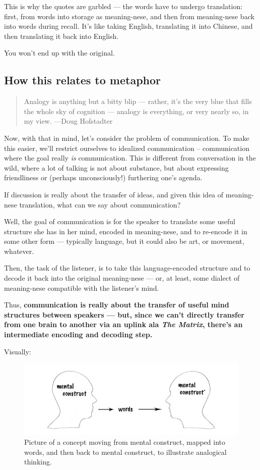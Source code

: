 This is why the quotes are garbled --- the
words have to undergo translation: first, from words into storage as meaning-nese, and then from meaning-nese back into words during recall.
It's like taking English, translating it into Chinese, and then
translating it back into English.

You won't end up with the original.

\subsection{How this relates to
metaphor}\label{how-this-relates-to-metaphor}

\begin{quote}
Analogy is anything but a bitty blip --- rather, it's the very blue that
fills the whole sky of cognition --- analogy is everything, or very
nearly so, in my view. \label{quote-attribute}{---Doug Hofstadter}
\end{quote}

Now, with that in mind, let's consider the problem of communication. To
make this easier, we'll restrict ourselves to idealized communication --
communication where the goal really \textit{is} communication. This is different
from conversation in the wild, where a lot of talking is not about
substance, but about expressing friendliness or (perhaps unconsciously!)
furthering one's agenda.

If discussion is really about the transfer of ideas, and given this idea of
meaning-nese translation, what can we say about communication?

Well, the goal of communication is for the speaker to translate some
useful structure she has in her mind, encoded in meaning-nese, and to
re-encode it in some other form --- typically language, but it could also
be art, or movement, whatever.

Then, the task of the listener, is to take this language-encoded
structure and to decode it back into the original meaning-nese --- or, at
least, some dialect of meaning-nese compatible with the listener's mind.

Thus, \textbf{communication is really about the transfer of useful mind
structures between speakers --- but, since we can't directly transfer
from one brain to another via an uplink ala \emph{The Matrix}, there's
an intermediate encoding and decoding step.}

Visually:

\begin{figure}[htbp]
\centering
\includegraphics[width=\textwidth]{graphics/analogical-thinking.jpg}
\caption{Picture of a concept moving from mental construct, mapped into
words, and then back to mental construct, to illustrate analogical
thinking.}
\end{figure}

